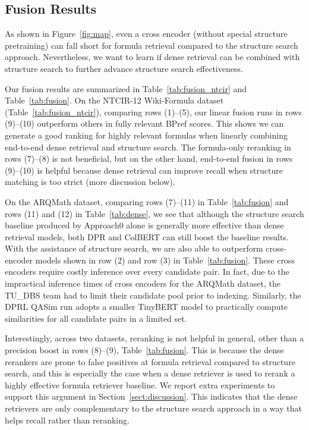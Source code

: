 \documentclass[11pt]{article}
\begin{document}
\begin{table}
\subsection{Fusion Results}

As shown in Figure~\ref{fig:map}, even a cross encoder (without special structure pretraining) can fall short for formula retrieval compared to the structure search approach.
Nevertheless, we want to learn if dense retrieval can be combined with structure search to further advance structure search effectiveness.

Our fusion results are summarized in Table~\ref{tab:fusion_ntcir} and  Table~\ref{tab:fusion}.
On the NTCIR-12 Wiki-Formula dataset (Table~\ref{tab:fusion_ntcir}),
comparing rows (1)--(5),
our linear fusion runs in rows (9)--(10) outperform others in fully relevant BPref scores.
This shows we can generate a good ranking for highly relevant formulas when linearly combining end-to-end dense retrieval and structure search.
The formula-only reranking in rows (7)--(8) is not beneficial,
but on the other hand, end-to-end fusion in rows (9)--(10) is helpful because dense retrieval can improve recall when structure matching is too strict (more discussion below).

On the ARQMath dataset,
comparing rows (7)--(11) in Table~\ref{tab:fusion} and rows (11) and (12) in Table~\ref{tab:dense}, we see that although the structure search baseline produced by Approach0 alone is generally more effective than dense retrieval models, both DPR and ColBERT can still boost the baseline results.
With the assistance of structure search, we are also able to outperform cross-encoder models shown in row (2) and row (3) in Table~\ref{tab:fusion}.
These cross encoders require costly inference over every candidate pair.
In fact, due to the impractical inference times of cross encoders for the ARQMath dataset, the TU\_DBS team had to limit their candidate pool prior to indexing.
Similarly, the DPRL QASim run adopts a smaller TinyBERT model to practically compute similarities for all candidate pairs in a limited set.


Interestingly, across two datasets, reranking is not helpful in general, other than a precision boost in rows (8)--(9), Table~\ref{tab:fusion}.
This is because the dense rerankers are prone to false positives at formula retrieval compared to structure search, and this is especially the case when a dense retriever is used to rerank a highly effective formula retriever baseline.
We report extra experiments to support this argument in Section~\ref{sect:discussion}.
This indicates that the dense retrievers are only complementary to the structure search approach in a way that helps recall rather than reranking.




\end{table}
\end{document}
